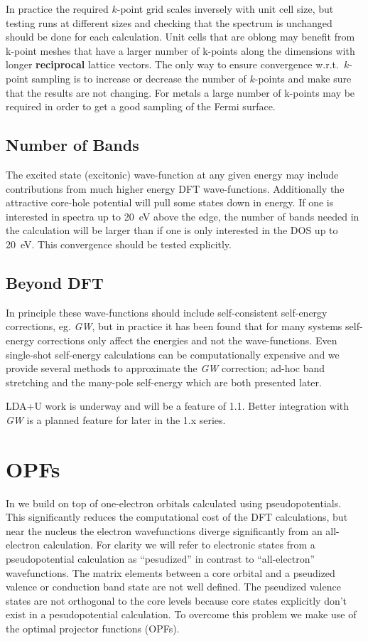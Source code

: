 \documentclass[11pt]{report}
\begin{document}
In practice the required $k$-point grid scales inversely with unit cell size, but testing runs at different sizes and checking that the spectrum is unchanged should be done for each calculation. Unit cells that are oblong may benefit from k-point meshes that have a larger number of k-points along the dimensions with longer {\bf reciprocal} lattice vectors. The only way to ensure convergence w.r.t.\ $k$-point sampling is to increase or decrease the number of $k$-points and make sure that the results are not changing. For metals a large number of k-points may be required in order to get a good sampling of the Fermi surface.

\section{Number of Bands}

The excited state (excitonic) wave-function at any given energy may include contributions from much higher energy DFT wave-functions. Additionally the attractive core-hole potential will pull some states down in energy. If one is interested in spectra up to 20~eV above the edge, the number of bands needed in the calculation will be larger than if one is only interested in the DOS up to 20~eV. This convergence should be tested explicitly. 

\section{Beyond DFT}

In principle these wave-functions should include self-consistent self-energy corrections, eg. {\it GW}, 
but in practice it has been found that for many systems 
self-energy corrections only affect the energies and not the wave-functions. 
Even single-shot self-energy calculations can be computationally expensive 
and we provide several methods to approximate the {\it GW} correction; 
ad-hoc band stretching and the many-pole self-energy which are both presented later.

LDA+U work is underway and will be a feature of  1.1. Better integration with {\it GW} is a planned feature for later in the 1.x series. 


\chapter{OPFs}
\label{opf}

In  we build on top of one-electron orbitals calculated using pseudopotentials. 
This significantly reduces the computational cost of the DFT calculations, but near the nucleus the electron wavefunctions diverge significantly from an all-electron calculation. 
For clarity we will refer to electronic states from a pseudopotential calculation as ``pesudized'' in contrast to ``all-electron'' wavefunctions. 
The matrix elements between a core orbital and a pseudized valence or conduction band state are not well defined. 
The pseudized valence states are not orthogonal to the core levels because core states explicitly don't exist in a pesudopotential calculation.
To overcome this problem we make use of the optimal projector functions (OPFs). 
\end{document}

